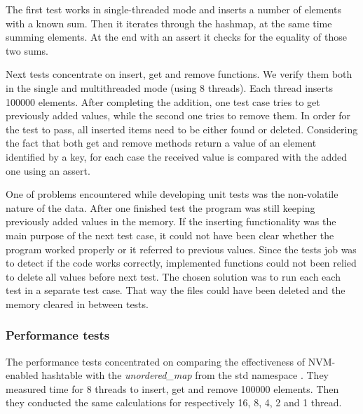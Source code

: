         The first test works in single-threaded mode and inserts a number of elements with a known sum.
        Then it iterates through the hashmap, at the same time summing elements. 
        At the end with an assert it checks for the equality of those two sums.
        
        Next tests concentrate on insert, get and remove functions. 
        We verify them both in the single and multithreaded mode (using 8 threads). Each thread inserts 100000 elements. 
        After completing the addition, one test case tries to get previously added values, while the second one tries to remove them. 
        In order for the test to pass, all inserted items need to be either found or deleted. 
        Considering the fact that both get and remove methods return a value of an element identified by a key, for each case the received value is compared with the added one using an assert.
        
        One of problems encountered while developing unit tests was the non-volatile nature of the data. 
        After one finished test the program was still keeping previously added values in the memory. 
        If the inserting functionality was the main purpose of the next test case, it could not have been clear whether the program worked properly or it referred to previous values. 
        Since the tests job was to detect if the code works correctly, implemented functions could not been relied to delete all values before next test. 
        The chosen solution was to run each each test in a separate test case. 
        That way the files could have been deleted and the memory cleared in between tests.


    \subsubsection{Performance tests}
        The performance tests concentrated on comparing the effectiveness of NVM-enabled hashtable with the \textit{unordered\_map} from the std namespace . 
        They measured time for 8 threads to insert, get and remove 100000 elements. 
        Then they conducted the same calculations for respectively 16, 8, 4, 2 and 1 thread.
        
